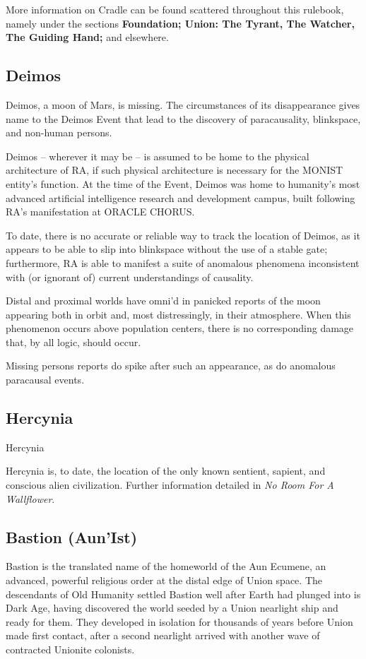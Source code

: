 More information on Cradle can be found scattered throughout this rulebook, namely under the
sections \textbf{Foundation; Union: The Tyrant, The Watcher, The Guiding Hand;} and elsewhere.

\subsection{Deimos}

Deimos, a moon of Mars, is missing. The circumstances of its disappearance gives name to the
Deimos Event that lead to the discovery of paracausality, blinkspace, and non-human persons.

Deimos -- wherever it may be -- is assumed to be home to the physical architecture of RA, if
such physical architecture is necessary for the MONIST entity's function. At the time of the
Event, Deimos was home to humanity's most advanced artificial intelligence research and
development campus, built following RA's manifestation at ORACLE CHORUS.

To date, there is no accurate or reliable way to track the location of Deimos, as it appears to be
able to slip into blinkspace without the use of a stable gate; furthermore, RA is able to manifest a
suite of anomalous phenomena inconsistent with (or ignorant of) current understandings of
causality.

Distal and proximal worlds have omni'd in panicked reports of the moon appearing both in orbit
and, most distressingly, in their atmosphere. When this phenomenon occurs above population
centers, there is no corresponding damage that, by all logic, should occur.

Missing persons reports do spike after such an appearance, as do anomalous paracausal
events.

\subsection{Hercynia}
Hercynia

Hercynia is, to date, the location of the only known sentient, sapient, and conscious alien
civilization. Further information detailed in \textit{No Room For A Wallflower}.

\subsection{Bastion (Aun'Ist)}

Bastion is the translated name of the homeworld of the Aun Ecumene, an advanced, powerful
religious order at the distal edge of Union space. The descendants of Old Humanity settled
Bastion well after Earth had plunged into is Dark Age, having discovered the world seeded by a
Union nearlight ship and ready for them. They developed in isolation for thousands of years
before Union made first contact, after a second nearlight arrived with another wave of contracted
Unionite colonists.

